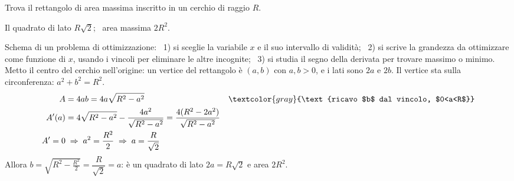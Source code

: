 
\begin{question}[ID=3.1, subtitle={Rettangolo di massima area inscritto in un cerchio di raggio $R$}, tags={ottimizzazione, geometria}, difficulty=media]
Trova il rettangolo di area massima inscritto in un cerchio di raggio \(R\).
\begin{solution}
Il quadrato di lato $R\sqrt2$; \ area massima $2R^2$.
\end{solution}
\begin{explanation}
Schema di un problema di ottimizzazione: \ 1) si sceglie la variabile $x$ e il suo intervallo di validità; \ 2) si scrive la grandezza da ottimizzare come funzione di $x$, usando i vincoli per eliminare le altre incognite; \ 3) si studia il segno della derivata per trovare massimo o minimo.
Metto il centro del cerchio nell'origine: un vertice del rettangolo è $(a,b)$ con $a,b>0$, e i lati sono $2a$ e $2b$. Il vertice sta sulla circonferenza: $a^2+b^2=R^2$.
\[\begin{aligned}
A &= 4ab=4a\sqrt{R^2-a^2} && \textcolor{gray}{\text{ricavo $b$ dal vincolo, $0<a<R$}}\\
A'(a) &= 4\sqrt{R^2-a^2}-\dfrac{4a^2}{\sqrt{R^2-a^2}}=\dfrac{4(R^2-2a^2)}{\sqrt{R^2-a^2}}\\
A'=0 &\;\Rightarrow\; a^2=\dfrac{R^2}{2} \;\Rightarrow\; a=\dfrac{R}{\sqrt2}
\end{aligned}\]
Allora $b=\sqrt{R^2-\tfrac{R^2}{2}}=\dfrac{R}{\sqrt2}=a$: è un quadrato di lato $2a=R\sqrt2$ e area $2R^2$.
\end{explanation}
\end{question}


